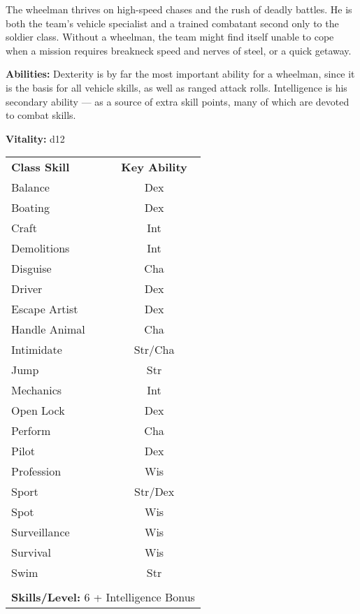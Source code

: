 \begin{multicols}{2}

The wheelman thrives on high-speed chases and the rush of deadly battles. He is both the team’s vehicle specialist and a trained combatant second only to the soldier class. Without a wheelman, the team might find itself unable to cope when a mission requires breakneck speed and nerves of steel, or a quick getaway.

\textbf{Abilities:} Dexterity is by far the most important ability for a wheelman, since it is the basis for all vehicle skills, as well as ranged attack rolls. Intelligence is his secondary ability — as a source of extra skill points, many of which are devoted to combat skills.

\textbf{Vitality:} d12

\end{multicols}

\begin{table}[htb]
\raggedright
\begin{tabular}{l c}
\textbf{Class Skill} & \textbf{Key Ability}\\

Balance & Dex\\
Boating & Dex\\
Craft & Int\\
Demolitions & Int\\
Disguise & Cha\\
Driver & Dex\\
Escape Artist	& Dex\\
Handle Animal &Cha\\
Intimidate & Str/Cha\\
Jump & Str\\
Mechanics & Int\\
Open Lock & Dex\\
Perform & Cha\\
Pilot & Dex\\
Profession & Wis\\
Sport & Str/Dex\\
Spot & Wis\\
Surveillance & Wis\\
Survival & Wis\\
Swim & Str\\

\multicolumn{2}{l}{\cellcolor{white}}\\
\multicolumn{2}{l}{\cellcolor{white}\textbf{Skills/Level:} 6 + Intelligence Bonus}\\
\end{tabular}
\end{table}

